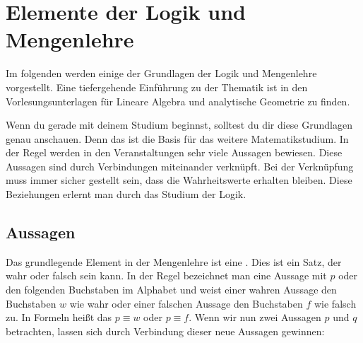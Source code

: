 \documentclass[ngerman,titlepage,twoside, parskip=half*]{scrreprt}
\theoremstyle{break}
\theoremstyle{nonumberbreak}
\newcommand*{\highl}[2][]{\textbf{\boldmath{#2}}%
  \ifthenelse{\equal{#1}{}}{\index{#2}}{\index{#1}}%
}
\begin{document}
\chapter{Elemente der Logik und Mengenlehre}

Im folgenden werden einige der Grundlagen der Logik und Mengenlehre
vorgestellt. Eine tiefergehende Einführung zu der Thematik ist in den
Vorlesungsunterlagen für Lineare Algebra und analytische Geometrie zu finden.

Wenn du gerade mit deinem Studium beginnst, solltest du dir diese Grundlagen
genau anschauen. Denn das ist die Basis für das weitere Matematikstudium. In
der Regel werden in den Veranstaltungen sehr viele Aussagen bewiesen. Diese
Aussagen sind durch Verbindungen miteinander verknüpft. Bei der Verknüpfung
muss immer sicher gestellt sein, dass die Wahrheitswerte erhalten bleiben.
Diese Beziehungen erlernt man durch das Studium der Logik.

\section{Aussagen}

Das grundlegende Element in der Mengenlehre ist eine
\highl{Aussage}. Dies ist ein Satz, der wahr oder falsch sein kann. In
der Regel bezeichnet man eine Aussage mit $p$ oder den folgenden
Buchstaben im Alphabet und weist einer wahren Aussage den Buchstaben
$w$ wie wahr oder einer falschen Aussage den Buchstaben $f$ wie falsch
zu. In Formeln heißt das $p\equiv w$ oder $p\equiv f$. Wenn wir nun
zwei Aussagen $p$ und $q$ betrachten, lassen sich durch Verbindung
dieser neue Aussagen gewinnen:
\end{document}
